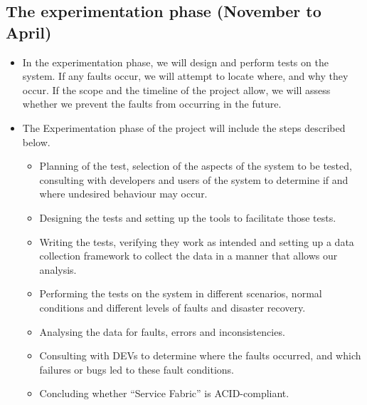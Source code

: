 \documentclass[a4paper,10pt,titlepage]{report}
\begin{document}
\subsection{The experimentation phase (November to April)}
\begin{itemize}
\item	In the experimentation phase, we will design and perform tests on the system. If any faults occur, we will attempt to locate where, and why they occur. If the scope and the timeline of the project allow, we will assess whether we prevent the faults from occurring in the future.
\item	The Experimentation phase of the project will include the steps described below. 
\begin{itemize}
\item	Planning of the test, selection of the aspects of the system to be tested, consulting with developers and users of the system to determine if and where undesired behaviour may occur.
\item	Designing the tests and setting up the tools to facilitate those tests.
\item	Writing the tests, verifying they work as intended and setting up a data collection framework to collect the data in a manner that allows our analysis.
\item	Performing the tests on the system in different scenarios, normal conditions and different levels of faults and disaster recovery.
\item	Analysing the data for faults, errors and inconsistencies.
\item	Consulting with DEVs to determine where the faults occurred, and which failures or bugs led to these fault conditions.
\item	Concluding whether “Service Fabric” is ACID-compliant. 
\end{itemize}
\end{itemize}
\end{document}
